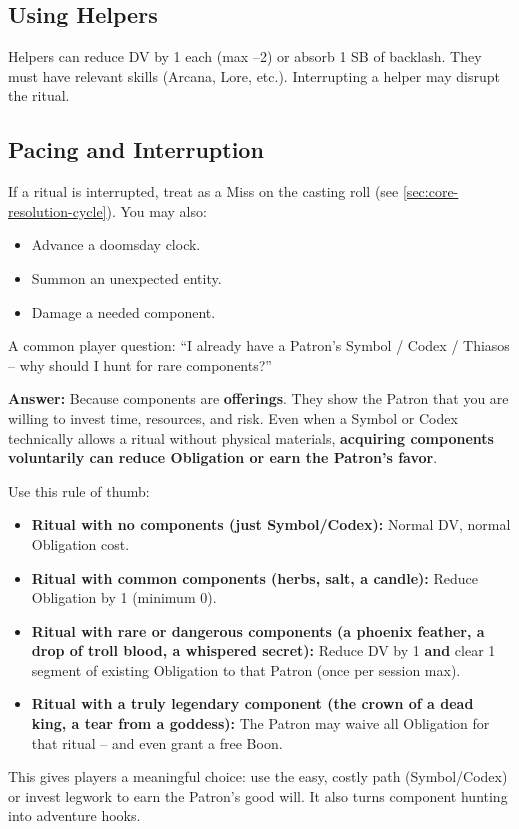 \subsection*{Using Helpers}
Helpers can reduce DV by 1 each (max –2) or absorb 1 SB of backlash. They must have relevant skills (Arcana, Lore, etc.). Interrupting a helper may disrupt the ritual.

\subsection*{Pacing and Interruption}
If a ritual is interrupted, treat as a Miss on the casting roll (see \ref{sec:core-resolution-cycle}). You may also:
\begin{itemize}
  \item Advance a doomsday clock.
  \item Summon an unexpected entity.
  \item Damage a needed component.
\end{itemize}

\begin{tcolorbox}[
  colback=green!5,
  colframe=green!75!black,
  title=Components as Devotion (Even with a Symbol/Codex/Thiasos),
  fonttitle=\bfseries
]
A common player question: “I already have a Patron’s Symbol / Codex / Thiasos – why should I hunt for rare components?”

\textbf{Answer:} Because components are \textbf{offerings}. They show the Patron that you are willing to invest time, resources, and risk. Even when a Symbol or Codex technically allows a ritual without physical materials, \textbf{acquiring components voluntarily can reduce Obligation or earn the Patron’s favor}.

Use this rule of thumb:
\begin{itemize}
  \item \textbf{Ritual with no components (just Symbol/Codex):} Normal DV, normal Obligation cost.
  \item \textbf{Ritual with common components (herbs, salt, a candle):} Reduce Obligation by 1 (minimum 0).
  \item \textbf{Ritual with rare or dangerous components (a phoenix feather, a drop of troll blood, a whispered secret):} Reduce DV by 1 \textbf{and} clear 1 segment of existing Obligation to that Patron (once per session max).
  \item \textbf{Ritual with a truly legendary component (the crown of a dead king, a tear from a goddess):} The Patron may waive all Obligation for that ritual – and even grant a free Boon.
\end{itemize}

This gives players a meaningful choice: use the easy, costly path (Symbol/Codex) or invest legwork to earn the Patron’s good will. It also turns component hunting into adventure hooks.
\end{tcolorbox}

